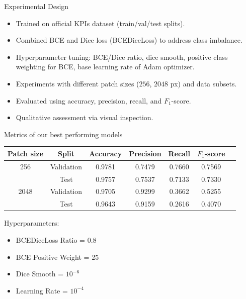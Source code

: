 \documentclass{beamer}
\begin{document}
\begin{frame}{Experimental Design}
    \begin{itemize}
        \item Trained on official KPIs dataset (train/val/test splits).
        \item Combined BCE and Dice loss (BCEDiceLoss) to address class imbalance. 
        \item Hyperparameter tuning: BCE/Dice ratio, dice smooth, positive class weighting for BCE, base learning rate of Adam optimizer.
        \item Experiments with different patch sizes ($256$, $2048$ px) and data subsets.
        \item Evaluated using accuracy, precision, recall, and $F_1$-score.
        \item Qualitative assessment via visual inspection.
    \end{itemize}
\end{frame}

\begin{frame}{Metrics of our best performing models}
    \begin{table}[t]
        \centering
        \begin{tabular}{c|c|ccccc}
            \toprule
            Patch size & Split & Accuracy & Precision & Recall & $F_1$-score \\
            \midrule
            256 & Validation & 0.9781 & 0.7479 & 0.7660 & 0.7569 \\
            & Test       & 0.9757 & 0.7537 & 0.7133 & 0.7330 \\
            \midrule
            2048 & Validation & 0.9705 & 0.9299 & 0.3662 & 0.5255 \\
            & Test       & 0.9643 & 0.9159 & 0.2616 & 0.4070 \\
            \bottomrule
        \end{tabular}
    \end{table}
    \begin{block}{Hyperparameters:}
        \begin{itemize}
            \item BCEDiceLoss Ratio = 0.8
            \item BCE Positive Weight = 25
            \item Dice Smooth = $10^{-6}$
            \item Learning Rate = $10^{-4}$
        \end{itemize}
    \end{block}
\end{frame}
\end{document}
